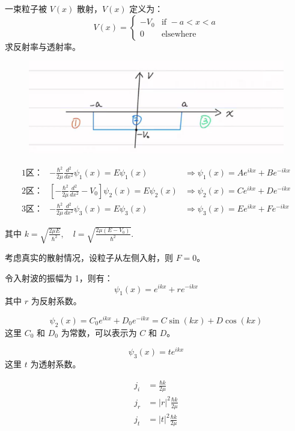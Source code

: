 \documentclass[lang=cn,10pt]{elegantbook}
\begin{document}
\begin{example}
	 一束粒子被 $V(x)$ 散射，$V(x)$ 定义为：
	\[
	V(x) = 
	\begin{cases} 
		-V_0 & \text{if } -a < x < a \\
		0 & \text{elsewhere}
	\end{cases}
	\]
	求反射率与透射率。
\end{example}
\begin{solution}
	\begin{figure}[H]
		\centering
		\includegraphics[width=0.7\linewidth]{figure/screenshot0026}
	\end{figure}
	\begin{align*}
		\text{1区：} & -\frac{\hbar^2}{2\mu} \frac{d^2}{dx^2} \psi_1(x) = E \psi_1(x) & \Rightarrow \psi_1(x) = A e^{ikx} + B e^{-ikx} \\
		\text{2区：} & \left[ -\frac{\hbar^2}{2\mu} \frac{d^2}{dx^2} - V_0 \right] \psi_2(x) = E \psi_2(x) & \Rightarrow \psi_2(x) = C e^{ikx} + D e^{-ikx} \\
		\text{3区：} & -\frac{\hbar^2}{2\mu} \frac{d^2}{dx^2} \psi_3(x) = E \psi_3(x) & \Rightarrow \psi_3(x) = E e^{ikx} + F e^{-ikx}
	\end{align*}
	
$	\text{其中 } k = \sqrt{\frac{2\mu E}{\hbar^2}}, \quad l = \sqrt{\frac{2\mu (E-V_0)}{\hbar^2}}.$

	考虑真实的散射情况，设粒子从左侧入射，则 $F = 0$。
	
	令入射波的振幅为 1，则有：
	\[
	\psi_1(x) = e^{ikx} + r e^{-ikx}
	\]
	其中 $r$ 为反射系数。
	
	\[
	\psi_2(x) = C_0 e^{ikx} + D_0 e^{-ikx} = C \sin(kx) + D \cos(kx)
	\]
	这里 $C_0$ 和 $D_0$ 为常数，可以表示为 $C$ 和 $D$。
	
	\[
	\psi_3(x) = t e^{ikx}
	\]
	这里 $t$ 为透射系数。
	
	\begin{align*}
		j_i &= \frac{\hbar k}{2\mu} \\
		j_r &= |r|^2 \frac{\hbar k}{2\mu} \\
		j_t &= |t|^2 \frac{\hbar k}{2\mu}
	\end{align*}
	

\end{solution}
\end{document}
